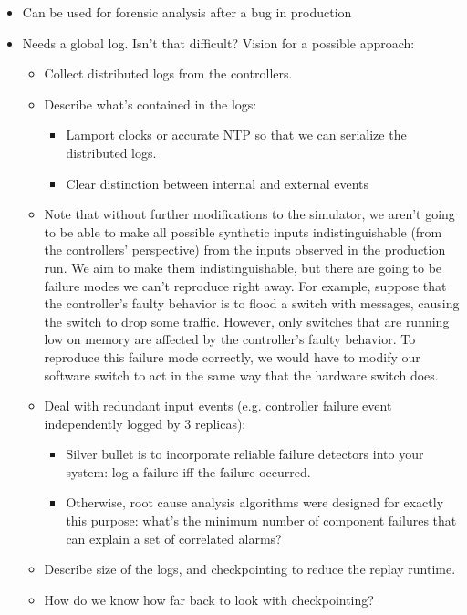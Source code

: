 \begin{itemize}
\item Can be used for forensic analysis after a bug in production
\item Needs a global log. Isn't that difficult? Vision for a possible approach:
\begin{itemize}
\item Collect distributed logs from the controllers.
\item Describe what's contained in the logs:
  \begin{itemize}
   \item Lamport clocks or accurate NTP so that we can serialize the distributed logs.
   \item Clear distinction between internal and external events
  \end{itemize}
\item Note that without further modifications to the simulator, we aren't going to be able to make all possible synthetic inputs indistinguishable (from the controllers' perspective) from the inputs observed in the production run. We aim to make them indistinguishable, but there are going to be failure modes we can't reproduce right away. For example, suppose that the controller's faulty behavior is to flood a switch with messages, causing the switch to drop some traffic. However, only switches that are running low on memory are affected by the controller's faulty behavior. To reproduce this failure mode correctly, we would have to modify our software switch to act in the same way that the hardware switch does.
\item Deal with redundant input events (e.g. controller failure event independently logged by 3 replicas):
  \begin{itemize}
    \item Silver bullet is to incorporate reliable failure detectors into your system: log a failure iff the failure occurred.
    \item Otherwise, root cause analysis algorithms were designed for exactly this purpose: what's the minimum number of component failures that can explain a set of correlated alarms?
  \end{itemize}
\item Describe size of the logs, and checkpointing to reduce the replay runtime.
\item How do we know how far back to look with checkpointing?
\end{itemize}
\end{itemize}

